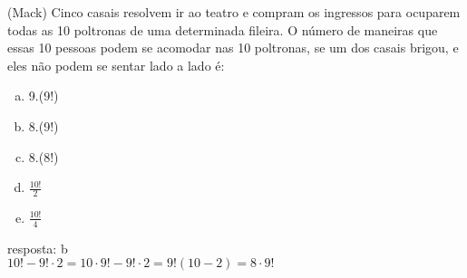\begin{ex}
  (Mack) Cinco casais resolvem ir ao teatro e compram os ingressos para ocuparem todas as 10 poltronas de uma determinada fileira. O número de maneiras que essas 10 pessoas podem se acomodar nas 10 poltronas, se um dos casais brigou, e eles não podem se sentar lado a lado é:
     \begin{enumerate} [(a)]
         \item 9.(9!)
         \item 8.(9!)
         \item 8.(8!)
         \item $\frac{10!}{2}$
         \item $\frac{10!}{4}$
     \end{enumerate}
       \begin{sol}
       resposta: b \\
       $10!-9!\cdot2=10\cdot9!-9!\cdot2=9!(10-2)=8\cdot9!$
       \end{sol}
 \end{ex}
